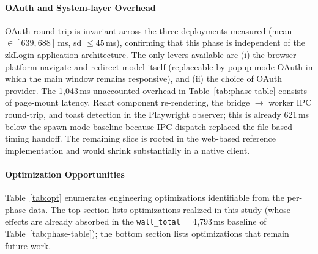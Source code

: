 \paragraph{OAuth and System-layer Overhead}

OAuth round-trip is invariant across the three deployments measured
(mean \(\in [639, 688]\)\,ms, sd $\le 45$\,ms), confirming that this
phase is independent of the zkLogin application architecture. The only
levers available are (i) the browser-platform navigate-and-redirect
model itself (replaceable by popup-mode OAuth in which the main window
remains responsive), and (ii) the choice of OAuth provider. The
1{,}043\,ms unaccounted overhead in Table~\ref{tab:phase-table}
consists of page-mount latency, React component re-rendering, the
bridge $\rightarrow$ worker IPC round-trip, and toast detection in the
Playwright observer; this is already 621\,ms below the spawn-mode
baseline because IPC dispatch replaced the file-based timing handoff.
The remaining slice is rooted in the web-based reference implementation
and would shrink substantially in a native client.

\paragraph{Optimization Opportunities}

Table~\ref{tab:opt} enumerates engineering optimizations identifiable
from the per-phase data. The top section lists optimizations realized
in this study (whose effects are already absorbed in the
\texttt{wall\_total} = 4{,}793\,ms baseline of
Table~\ref{tab:phase-table}); the bottom section lists optimizations
that remain future work.

